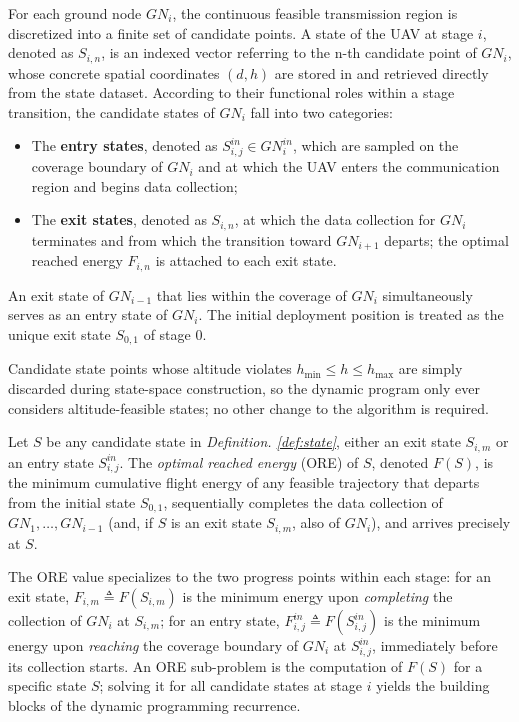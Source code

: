 \begin{definition}\label{def:state}
    For each ground node $GN_i$, the continuous feasible transmission region is discretized into a finite set of candidate points.
    A state of the UAV at stage $i$, denoted as $S_{i,n}$, is an indexed vector referring to the n-th candidate point of $GN_i$, whose concrete spatial coordinates $(d,h)$ are stored in and retrieved directly from the state dataset.
    According to their functional roles within a stage transition, the candidate states of $GN_i$ fall into two categories:
    \begin{itemize}
        \item The \textbf{entry states}, denoted as $S^{in}_{i,j}\in GN_i^{in}$, which are sampled on the coverage boundary of $GN_i$ and at which the UAV enters the communication region and begins data collection;
        \item The \textbf{exit states}, denoted as $S_{i,n}$, at which the data collection for $GN_i$ terminates and from which the transition toward $GN_{i+1}$ departs; the optimal reached energy $F_{i,n}$ is attached to each exit state.
    \end{itemize}

    An exit state of $GN_{i-1}$ that lies within the coverage of $GN_i$ simultaneously serves as an entry state of $GN_i$.
    The initial deployment position is treated as the unique exit state $S_{0,1}$ of stage 0.
\end{definition}

Candidate state points whose altitude violates $ h_{\min}\le h \le h_{\max}$ are simply discarded during state-space construction, so the dynamic program only ever considers altitude-feasible states; no other change to the algorithm is required.



\begin{definition}\label{def:ORE}
    Let $S$ be any candidate state in \textit{Definition. \ref{def:state}}, either an exit state $S_{i,m}$ or an entry state $S^{in}_{i,j}$.
    The \textit{optimal reached energy} (ORE) of $S$, denoted $F(S)$, is the minimum cumulative flight energy of any feasible trajectory that departs from the initial state $S_{0,1}$, sequentially completes the data collection of $GN_1, \dots, GN_{i-1}$ (and, if $S$ is an exit state $S_{i,m}$, also of $GN_i$), and arrives precisely at $S$.

    The ORE value specializes to the two progress points within each stage: for an exit state, $F_{i,m} \triangleq F(S_{i,m})$ is the minimum energy upon \textit{completing} the collection of $GN_i$ at $S_{i,m}$; for an entry state, $F^{in}_{i,j} \triangleq F(S^{in}_{i,j})$ is the minimum energy upon \textit{reaching} the coverage boundary of $GN_i$ at $S^{in}_{i,j}$, immediately before its collection starts.
    An ORE sub-problem is the computation of $F(S)$ for a specific state $S$; solving it for all candidate states at stage $i$ yields the building blocks of the dynamic programming recurrence.
\end{definition}

